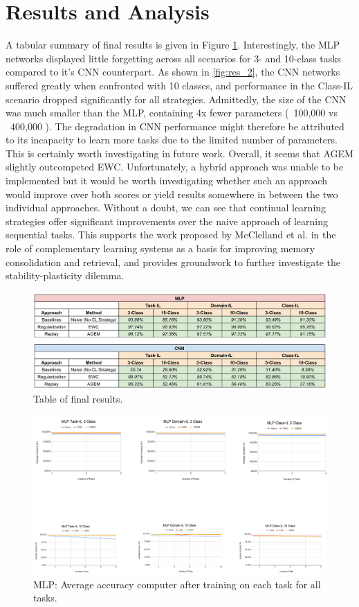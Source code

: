 \documentclass{article}
\begin{document}
\section{Results and Analysis}
A tabular summary of final results is given in Figure \ref{fig:results_table}. Interestingly, the MLP networks displayed little forgetting across all scenarios for 3- and 10-class tasks compared to it’s CNN counterpart. As shown in \ref{fig:res_2}, the CNN networks suffered greatly when confronted with 10 classes, and performance in the Class-IL scenario dropped significantly for all strategies. Admittedly, the size of the CNN was much smaller than the MLP, containing 4x fewer parameters (~100,000 vs ~400,000 ). The degradation in CNN performance might therefore be attributed to its incapacity to learn more tasks due to the limited number of parameters. This is certainly worth investigating in future work. Overall, it seems that AGEM slightly outcompeted EWC. Unfortunately, a hybrid approach was unable to be implemented but it would be worth investigating whether such an approach would improve over both scores or yield results somewhere in between the two individual approaches. Without a doubt, we can see that continual learning strategies offer significant improvements over the naive approach of learning sequential tasks. This supports the work proposed by McClelland et al. \cite{mcclelland1995there} in the role of complementary learning systems as a basis for improving memory consolidation and retrieval, and provides groundwork to further investigate the stability-plasticity dilemma. 

\begin{figure}[h]
	\centering
    \includegraphics[width=1\linewidth]{results_table}
    \caption{Table of final results.}
	\label{fig:results_table}
\end{figure}

\begin{figure}[h]
	\centering
    \includegraphics[width=1\linewidth]{res_1}
    \caption{MLP: Average accuracy computer after training on each task for all tasks.}
	\label{fig:res_1}
\end{figure}
\end{document}
